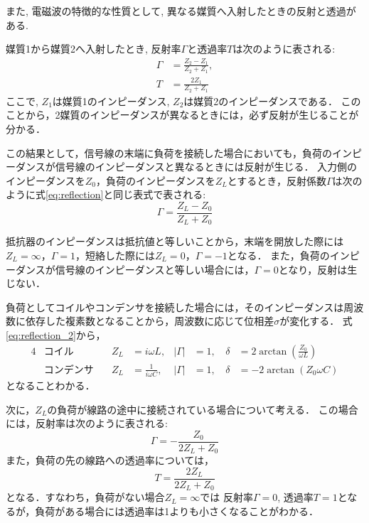 \documentclass[uplatex,dvipdfmx,a4j,12pt]{jsarticle}
\begin{document}
\enskip

また, 電磁波の特徴的な性質として, 異なる媒質へ入射したときの反射と透過がある.

媒質1から媒質2へ入射したとき, 反射率$\Gamma$と透過率$T$は次のように表される:
\begin{align}
  \Gamma &= \frac{Z_2 - Z_1}{Z_2 + Z_1}, \label{eq:reflection}\\
  T &= \frac{2Z_1}{Z_2 + Z_1}
\end{align}
ここで, $Z_1$は媒質1のインピーダンス, $Z_2$は媒質2のインピーダンスである．
このことから，2媒質のインピーダンスが異なるときには，必ず反射が生じることが分かる．

この結果として，信号線の末端に負荷を接続した場合においても，負荷のインピーダンスが信号線のインピーダンスと異なるときには反射が生じる．
入力側のインピーダンスを$Z_0$，負荷のインピーダンスを$Z_L$とするとき，反射係数$\Gamma$は次のように式\eqref{eq:reflection}と同じ表式で表される:
\begin{equation}
  \Gamma = \frac{Z_L - Z_0}{Z_L + Z_0} \label{eq:reflection_2}
\end{equation}

抵抗器のインピーダンスは抵抗値と等しいことから，末端を開放した際には$Z_L = \infty$，$\Gamma = 1$，短絡した際には$Z_L = 0$，$\Gamma = -1$となる．
また，負荷のインピーダンスが信号線のインピーダンスと等しい場合には，$\Gamma = 0$となり，反射は生じない．

負荷としてコイルやコンデンサを接続した場合には，そのインピーダンスは周波数に依存した複素数となることから，周波数に応じて位相差$\sigma$が変化する．
式\eqref{eq:reflection_2}から， 
\begin{alignat}{4}
  &\text{コイル}\quad & Z_L &= i\omega L, & |\Gamma| &= 1, & \delta &= 2\arctan\left(\frac{ Z_0}{ \omega L}\right) \\
  &\text{コンデンサ}\quad & Z_L &= \frac{1}{i\omega C},\, & |\Gamma| &= 1,\, & \delta &= -2\arctan\left({Z_0\omega C}\right)
\end{alignat}
となることわかる．

次に，$Z_L$の負荷が線路の途中に接続されている場合について考える．
この場合には，反射率は次のように表される:
\begin{equation}
  \Gamma = -\frac{Z_0}{2Z_L + Z_0}
\end{equation}
また，負荷の先の線路への透過率については，
\begin{equation}
  T = \frac{2Z_L}{2Z_L + Z_0}
\end{equation}
となる．すなわち，負荷がない場合$Z_L = \infty$では 反射率$\Gamma =  0$, 透過率$T = 1$となるが，負荷がある場合には透過率は1よりも小さくなることがわかる．
\end{document}
